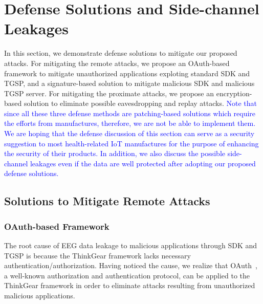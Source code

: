 \section{Defense Solutions and Side-channel Leakages}
\label{sec:defense}

In this section, we demonstrate defense solutions to mitigate our proposed attacks. For mitigating the remote attacks, we propose an OAuth-based framework to mitigate unauthorized applications exploting standard SDK and TGSP, and a signature-based solution to mitigate malicious SDK and malicious TGSP server. For mitigating the proximate attacks, we propose an encryption-based solution to eliminate possible eavesdropping and replay attacks. \textcolor{blue}{Note that since all these three defense methods are patching-based solutions which require the efforts from manufactures, therefore, we are not be able to implement them. We are hoping that the defense discussion of this section can serve as a security suggestion to most health-related IoT manufactures for the purpose of enhancing the security of their products. In addition, we also discuss the possible side-channel leakages even if the data are well protected after adopting our proposed defense solutions.}

\subsection{Solutions to Mitigate Remote Attacks}

\subsubsection{OAuth-based Framework}
The root cause of EEG data leakage to malicious applications through SDK and TGSP is because the ThinkGear framework lacks necessary authentication/authorization. Having noticed the cause, we realize that OAuth~\cite{hardt2012oauth}, a well-known authorization and authentication protocol, can be applied to the ThinkGear framework in order to eliminate attacks resulting from unauthorized malicious applications.

